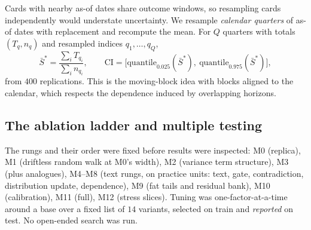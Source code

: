 Cards with nearby as-of dates share outcome windows, so resampling cards independently would understate uncertainty. We resample \emph{calendar
quarters} of as-of dates with replacement and recompute the mean. For $Q$ quarters with totals $(T_q,n_q)$ and resampled indices $q_1,\dots,q_Q$,
\begin{equation}
  \bar S^{*}=\frac{\sum_{i}T_{q_i}}{\sum_in_{q_i}},\qquad \text{CI}=\bigl[\mathrm{quantile}_{0.025}(\bar S^*),\ \mathrm{quantile}_{0.975}(\bar S^*)\bigr],
\end{equation}
from $400$ replications. This is the moving-block idea with blocks aligned to the calendar, which respects the dependence induced by overlapping
horizons.

\subsection{The ablation ladder and multiple testing}

The rungs and their order were fixed before results were inspected: M0 (replica), M1 (driftless random walk at M0's width), M2 (variance term
structure), M3 (plus analogues), M4--M8 (text rungs, on practice units: text, gate, contradiction, distribution update, dependence), M9 (fat tails
and residual bank), M10 (calibration), M11 (full), M12 (stress slices). Tuning was one-factor-at-a-time around a base over a fixed list of $14$
variants, selected on train and \emph{reported} on test. No open-ended search was run.
